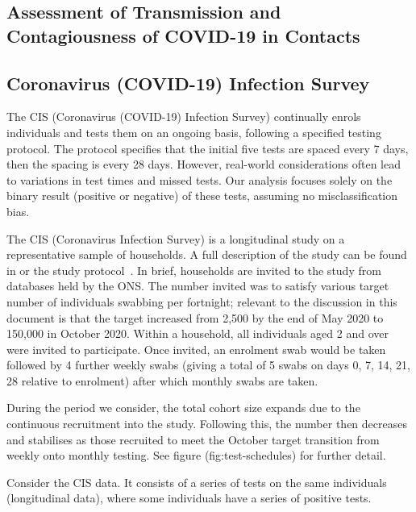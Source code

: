 \documentclass[thesis.tex]{subfiles}
\begin{document}
\subsection{Assessment of Transmission and Contagiousness of COVID-19 in Contacts}

\subsection{Coronavirus (COVID-19) Infection Survey} \label{intro:sec:cis}

The CIS (Coronavirus (COVID-19) Infection Survey) continually enrols individuals and tests them on an ongoing basis, following a
specified testing protocol. The protocol specifies that the initial five
tests are spaced every 7 days, then the spacing is every 28 days.
However, real-world considerations often lead to variations in test
times and missed tests. Our analysis focuses solely on the binary result
(positive or negative) of these tests, assuming no misclassification
bias.

The CIS (Coronavirus Infection Survey) is a longitudinal study on a representative sample of households.
A full description of the study can be found in \textcite[][supplementary materials]{pouwelsCommunity} or the study protocol~\autocite{cisProtocol}.
In brief, households are invited to the study from databases held by the ONS.
The number invited was to satisfy various target number of individuals swabbing per fortnight; relevant to the discussion in this document is that the target increased from 2,500 by the end of May 2020 to 150,000 in October 2020.
Within a household, all individuals aged 2 and over were invited to participate.
Once invited, an enrolment swab would be taken followed by 4 further weekly swabs (giving a total of 5 swabs on days 0, 7, 14, 21, 28 relative to enrolment) after which monthly swabs are taken.

During the period we consider, the total cohort size expands due to the continuous recruitment into the study.
Following this, the number then decreases and stabilises as those recruited to meet the October target transition from weekly onto monthly testing.
See figure \@ref(fig:test-schedules) for further detail.


Consider the CIS data.
It consists of a series of tests on the same individuals (longitudinal data), where some individuals have a series of positive tests.
\end{document}
